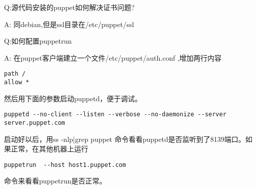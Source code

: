 \msyh Q:源代码安装的puppet如何解决证书问题? \par
A: \song 同debian,但是ssl目录在/etc/puppet/ssl \par

\msyh Q:如何配置puppetrun \par
A: \song 在puppet客户端建立一个文件/etc/puppet/auth.conf ,增加两行内容\par
\msyh \begin{lstlisting}
path /
allow *
\end{lstlisting} \song

然后用下面的参数启动puppetd，便于调试。
\msyh \begin{lstlisting}
puppetd --no-client --listen --verbose --no-daemonize --server server.puppet.com
\end{lstlisting} \song
启动好以后，用ss -nlp|grep puppet 命令看看puppetd是否监听到了8139端口。如果正常，在其他机器上运行
\msyh \begin{lstlisting}
puppetrun  --host host1.puppet.com 
\end{lstlisting} \song
命令来看看puppetrun是否正常。



